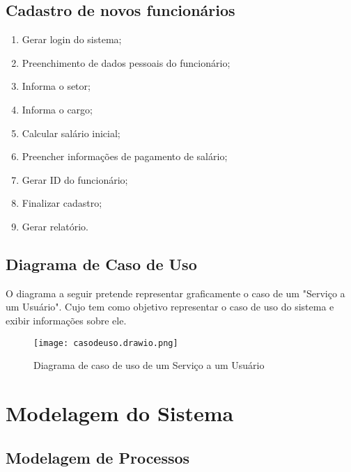 \subsection{ Cadastro de novos funcionários}
\begin{enumerate}
      \item Gerar login do sistema;
      \item Preenchimento de dados pessoais do funcionário;
      \item Informa o setor;
      \item Informa o cargo;
      \item Calcular salário inicial;
      \item Preencher informações de pagamento de salário;
      \item Gerar ID do funcionário;
      \item Finalizar cadastro;
      \item Gerar relatório.

\end{enumerate}

\subsection{ Diagrama de Caso de Uso}
O diagrama a seguir pretende representar graficamente o caso de um "Serviço a um Usuário".
Cujo tem como objetivo representar o caso de uso do sistema e exibir informações sobre ele.

\begin{figure}[H]
      \begin{center}
            \caption{ Diagrama de caso de uso de um Serviço a um Usuário} \label{afp}
            \texttt{[image: casodeuso.drawio.png]} \\


      \end{center}
\end{figure}








\section{Modelagem do Sistema}


\subsection{Modelagem de Processos}

